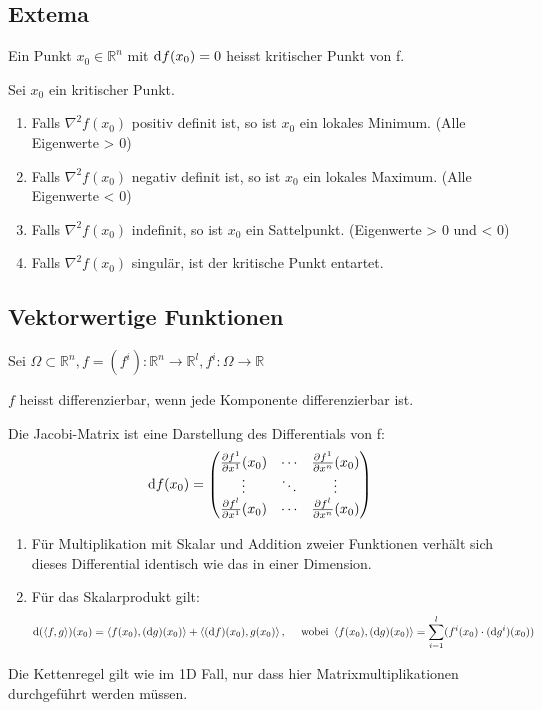 	\subsection{Extema}
		\begin{definition}
			Ein Punkt $x_0 \in \mathbb{R}^n$ mit $ \mathrm{d} f(x_0) = 0$ heisst kritischer Punkt von f.
		\end{definition}
		\begin{proofhelp}
			Sei $x_0$ ein kritischer Punkt.
			\begin{enumerate}
				\item Falls $\nabla^2f(x_0)$ positiv definit ist, so ist $x_0$ ein lokales Minimum. (Alle Eigenwerte > 0)
				\item Falls $\nabla^2f(x_0)$ negativ definit ist, so ist $x_0$ ein lokales Maximum. (Alle Eigenwerte < 0)
				\item Falls $\nabla^2f(x_0)$ indefinit, so ist $x_0$ ein Sattelpunkt.	(Eigenwerte > 0 und < 0)
				\item Falls $\nabla^2f(x_0)$ singulär, ist der kritische Punkt entartet.
			\end{enumerate}
		\end{proofhelp}		
	\subsection{Vektorwertige Funktionen}
		Sei $\Omega \subset \mathbb{R}^n, f = (f^i) : \mathbb{R}^n \to \mathbb{R}^l, f^i : \Omega \to \mathbb{R}$ \\
		\begin{definition}
			$f$ heisst differenzierbar, wenn jede Komponente differenzierbar ist.
		\end{definition}
		\begin{proofhelp}
			Die Jacobi-Matrix ist eine Darstellung des Differentials von f:
			$$
			\d f(x_0) = 
				\begin{pmatrix}
					\pdiff{f^1}{x^1}(x_0) 	& \cdots & \pdiff{f^1}{x^n}(x_0) \\
					\vdots					& \ddots & \vdots				\\
					\pdiff{f^l}{x^1}(x_0)	& \cdots & \pdiff{f^l}{x^n}(x_0) \\
				\end{pmatrix}
			$$
		\end{proofhelp}
		\begin{proofhelp}[Regeln]
			\hfill
			\begin{enumerate}
				\item Für Multiplikation mit Skalar und Addition zweier Funktionen verhält sich dieses Differential identisch wie das in einer Dimension.
				\item Für das Skalarprodukt gilt:
				$$ 
					\mathrm{d} (\left\langle f, g \right\rangle)(x_0) = \left\langle f(x_0), (\mathrm{d} g)(x_0) \right\rangle + \left\langle (\mathrm{d} f)(x_0), g(x_0) \right\rangle, \quad\text{ wobei } \left\langle f(x_0), (\mathrm{d} g)(x_0) \right\rangle = \sum\limits_{i=1}^{l}(f^i(x_0)\cdot (\mathrm{d} g^i)(x_0))
				$$
			\end{enumerate}
		\end{proofhelp}
		\begin{proofhelp}[Kettenregel]
			Die Kettenregel gilt wie im 1D Fall, nur dass hier Matrixmultiplikationen durchgeführt werden müssen.
		\end{proofhelp}